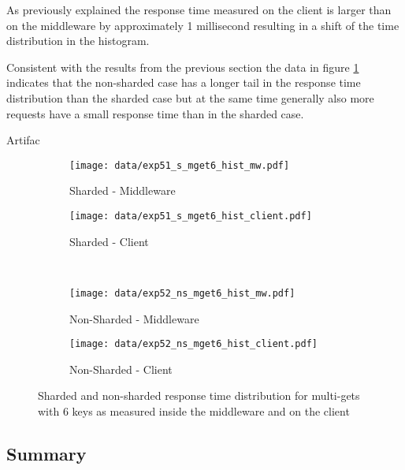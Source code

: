 \documentclass[report.tex]{subfiles}
\begin{document}
As previously explained the response time measured on the client is larger than on the middleware by approximately 1 millisecond resulting in a shift of the time distribution in the histogram.

Consistent with the results from the previous section the data in figure \ref{exp5_hist} indicates that the non-sharded case has a longer tail in the response time distribution than the sharded case but at the same time generally also more requests have a small response time than in the sharded case.

Artifac

\begin{figure}
	\begin{subfigure}[b]{.49\linewidth}
		\centering
		\texttt{[image: data/exp51\_s\_mget6\_hist\_mw.pdf]}
		\caption{Sharded - Middleware}
	\end{subfigure}\hfill
	\begin{subfigure}[b]{.49\linewidth}
		\centering
		\texttt{[image: data/exp51\_s\_mget6\_hist\_client.pdf]}
		\caption{Sharded - Client}
	\end{subfigure} \\
	\begin{subfigure}[b]{.49\linewidth}
		\centering
		\texttt{[image: data/exp52\_ns\_mget6\_hist\_mw.pdf]}
		\caption{Non-Sharded - Middleware}
	\end{subfigure}\hfill
	\begin{subfigure}[b]{.49\linewidth}
		\centering
		\texttt{[image: data/exp52\_ns\_mget6\_hist\_client.pdf]}
		\caption{Non-Sharded - Client}
	\end{subfigure}%
	\caption{Sharded and non-sharded response time distribution for multi-gets with 6 keys as measured inside the middleware and on the client}\label{exp5_hist}
\end{figure}

\subsection{Summary}



\end{document}
